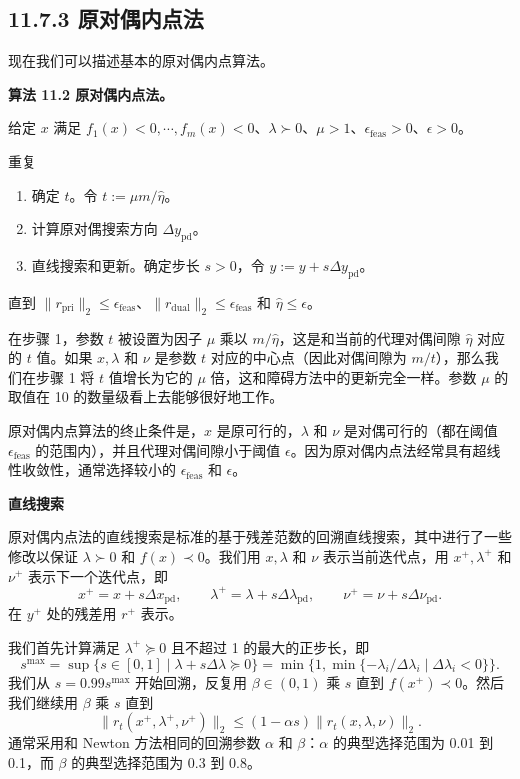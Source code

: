 \documentclass[UTF8,12pt,a4paper,fontset=fandol]{ctexart}
\begin{document}
\subsection*{11.7.3 原对偶内点法}

现在我们可以描述基本的原对偶内点算法。

\noindent\textbf{算法 11.2 原对偶内点法。}

给定 $x$ 满足 $f_1(x)<0,\cdots,f_m(x)<0$、$\lambda\succ 0$、$\mu>1$、$\epsilon_{\mathrm{feas}}>0$、$\epsilon>0$。

重复
\begin{enumerate}
\item 确定 $t$。令 $t:=\mu m/\hat{\eta}$。
\item 计算原对偶搜索方向 $\Delta y_{\mathrm{pd}}$。
\item 直线搜索和更新。确定步长 $s>0$，令 $y:=y+s\Delta y_{\mathrm{pd}}$。
\end{enumerate}
直到 $\|r_{\mathrm{pri}}\|_2\leq\epsilon_{\mathrm{feas}}$、$\|r_{\mathrm{dual}}\|_2\leq\epsilon_{\mathrm{feas}}$ 和 $\hat{\eta}\leq\epsilon$。

在步骤 1，参数 $t$ 被设置为因子 $\mu$ 乘以 $m/\hat{\eta}$，这是和当前的代理对偶间隙 $\hat{\eta}$ 对应的 $t$ 值。如果 $x,\lambda$ 和 $\nu$ 是参数 $t$ 对应的中心点（因此对偶间隙为 $m/t$），那么我们在步骤 1 将 $t$ 值增长为它的 $\mu$ 倍，这和障碍方法中的更新完全一样。参数 $\mu$ 的取值在 10 的数量级看上去能够很好地工作。

原对偶内点算法的终止条件是，$x$ 是原可行的，$\lambda$ 和 $\nu$ 是对偶可行的（都在阈值 $\epsilon_{\mathrm{feas}}$ 的范围内），并且代理对偶间隙小于阈值 $\epsilon$。因为原对偶内点法经常具有超线性收敛性，通常选择较小的 $\epsilon_{\mathrm{feas}}$ 和 $\epsilon$。

\noindent\textbf{直线搜索}

原对偶内点法的直线搜索是标准的基于残差范数的回溯直线搜索，其中进行了一些修改以保证 $\lambda\succ 0$ 和 $f(x)\prec 0$。我们用 $x,\lambda$ 和 $\nu$ 表示当前迭代点，用 $x^+,\lambda^+$ 和 $\nu^+$ 表示下一个迭代点，即
\[
x^+=x+s\Delta x_{\mathrm{pd}},\qquad
\lambda^+=\lambda+s\Delta\lambda_{\mathrm{pd}},\qquad
\nu^+=\nu+s\Delta\nu_{\mathrm{pd}}.
\]
在 $y^+$ 处的残差用 $r^+$ 表示。

我们首先计算满足 $\lambda^+\succeq 0$ 且不超过 1 的最大的正步长，即
\[
s^{\max}=\sup\{s\in[0,1]\mid \lambda+s\Delta\lambda\succeq0\}
=\min\{1,\min\{-\lambda_i/\Delta\lambda_i\mid \Delta\lambda_i<0\}\}.
\]
我们从 $s=0.99s^{\max}$ 开始回溯，反复用 $\beta\in(0,1)$ 乘 $s$ 直到 $f(x^+)\prec0$。然后我们继续用 $\beta$ 乘 $s$ 直到
\[
\|r_t(x^+,\lambda^+,\nu^+)\|_2\leq (1-\alpha s)\|r_t(x,\lambda,\nu)\|_2.
\]
通常采用和 Newton 方法相同的回溯参数 $\alpha$ 和 $\beta$：$\alpha$ 的典型选择范围为 0.01 到 0.1，而 $\beta$ 的典型选择范围为 0.3 到 0.8。
\end{document}
